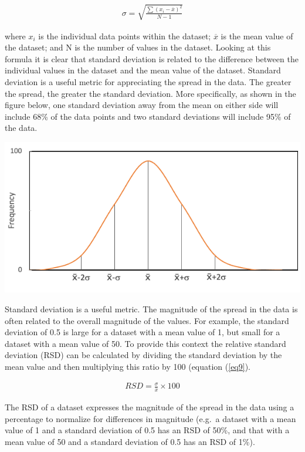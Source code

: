 \documentclass[
]{book}
\begin{document}
\[
\begin{align}
    \sigma = \sqrt{ \frac{\sum (x_i-\overline{x})^{2}}{N-1}} \label{eq8}\tag{8} 
\end{align}
\]

where \(x_i\) is the individual data points within the dataset; \(\overline{x}\) is the mean value of the dataset; and N is the number of values in the dataset. Looking at this formula it is clear that standard deviation is related to the difference between the individual values in the dataset and the mean value of the dataset. Standard deviation is a useful metric for appreciating the spread in the data. The greater the spread, the greater the standard deviation. More specifically, as shown in the figure below, one standard deviation away from the mean on either side will include 68\% of the data points and two standard deviations will include 95\% of the data.

\includegraphics{images/StandardDeviation.png}

Standard deviation is a useful metric. The magnitude of the spread in the data is often related to the overall magnitude of the values. For example, the standard deviation of 0.5 is large for a dataset with a mean value of 1, but small for a dataset with a mean value of 50. To provide this context the relative standard deviation (RSD) can be calculated by dividing the standard deviation by the mean value and then multiplying this ratio by 100 (equation (\ref{eq9}).

\[
\begin{align}
    RSD = \frac{\sigma}{\overline{x}} \times 100 \label{eq9}\tag{9} 
\end{align}
\]

The RSD of a dataset expresses the magnitude of the spread in the data using a percentage to normalize for differences in magnitude (e.g.~a dataset with a mean value of 1 and a standard deviation of 0.5 has an RSD of 50\%, and that with a mean value of 50 and a standard deviation of 0.5 has an RSD of 1\%).
\end{document}
